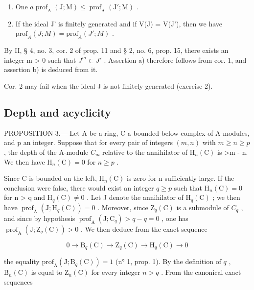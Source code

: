 \begin{enumerate}
\def\labelenumi{\alph{enumi})}
\item
  One \(a \operatorname{prof}_{\mathrm{A}}(\mathrm{J}; \mathrm{M}) \leqslant \operatorname{prof}_{\mathrm{A}}(\mathrm{J}'; \mathrm{M})\) .
\item
  If the ideal J' is finitely generated and if V(J) = V(J'), then we have \(\text{prof}_{A}(J; M) = \text{prof}_{A}(J'; M)\) .
\end{enumerate}

By II, § 4, no. 3, cor. 2 of prop. 11 and § 2, no. 6, prop. 15, there exists an integer m \textgreater{} 0 such that \(J^{m} \subset J'\) . Assertion a) therefore follows from cor. 1, and assertion b) is deduced from it.

Cor. 2 may fail when the ideal J is not finitely generated (exercise 2).

\subsection{Depth and acyclicity}

PROPOSITION 3.--- Let A be a ring, C a bounded-below complex of A-modules, and p an integer. Suppose that for every pair of integers \((m,n)\) with \(m \geqslant n \geqslant p\) , the depth of the A-module \(C_{m}\) relative to the annihilator of \(\mathrm{H}_{n}(\mathrm{C})\) is \textgreater m - n. We then have \(\mathrm{H}_{n}(\mathrm{C}) = 0\) for \(n \geqslant p\) .

Since C is bounded on the left, \(\mathrm{H}_{n}(\mathrm{C})\) is zero for n sufficiently large. If the conclusion were false, there would exist an integer \(q \geqslant p\) such that \(\mathrm{H}_{n}(\mathrm{C}) = 0\) for n \textgreater{} q and \(\mathrm{H}_{q}(\mathrm{C}) \neq 0\) . Let J denote the annihilator of \(\mathrm{H}_{q}(\mathrm{C})\) ; we then have \(\operatorname{prof}_{\mathrm{A}}(\mathrm{J}; \mathrm{H}_{q}(\mathrm{C})) = 0\) . Moreover, since \(\mathrm{Z}_{q}(\mathrm{C})\) is a submodule of \(C_{q}\) , and since by hypothesis \(\operatorname{prof}_{\mathrm{A}}(\mathrm{J}; \mathrm{C}_{q}) > q - q = 0\) , one has \(\operatorname{prof}_{\mathrm{A}}(\mathrm{J}; \mathrm{Z}_{q}(\mathrm{C})) > 0\) . We then deduce from the exact sequence

\[
0 \to \mathrm{B} _ {q} (\mathrm{C}) \to \mathrm{Z} _ {q} (\mathrm{C}) \to \mathrm{H} _ {q} (\mathrm{C}) \to 0
\]

the equality \(\mathrm{prof}_{\mathrm{A}}(\mathrm{J};\mathrm{B}_q(\mathrm{C})) = 1\) (n° 1, prop. 1). By the definition of \(q\) , \(\mathrm{B}_n(\mathrm{C})\) is equal to \(\mathrm{Z}_n(\mathrm{C})\) for every integer \(n > q\) . From the canonical exact sequences

